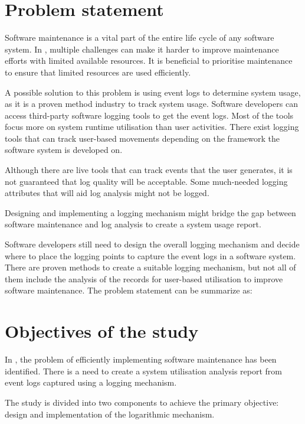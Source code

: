 \section{Problem statement}\label{sec:ch1_problemStatement}
Software maintenance is a vital part of the entire life cycle of any software system. In , multiple challenges can make it harder to improve maintenance efforts with limited available resources. It is beneficial to prioritise maintenance to ensure that limited resources are used efficiently. \par A possible solution to this problem is using event logs to determine system usage, as it is a proven method industry to track system usage. Software developers can access third-party software logging tools to get the event logs. Most of the tools focus more on system runtime utilisation than user activities. There exist logging tools that can track user-based movements depending on the framework the software system is developed on.\par Although there are live tools that can track events that the user generates, it is not guaranteed that log quality will be acceptable. Some much-needed logging attributes that will aid log analysis might not be logged.\par Designing and implementing a logging mechanism might bridge the gap between software maintenance and log analysis to create a system usage report.\par Software developers still need to design the overall logging mechanism and decide where to place the logging points to capture the event logs in a software system. There are proven methods to create a suitable logging mechanism, but not all of them include the analysis of the records for user-based utilisation to improve software maintenance. The problem statement can be summarize as:

\begin{center}
	\begin{tcolorbox}[colback=lightgray, colframe=black, sharp corners=all, arc=4pt]
		\begin{minipage}{\textwidth}
			\RaggedRight\textit{\problemStatement}
		\end{minipage}
	\end{tcolorbox}
\end{center}

\section{Objectives of the study}\label{sec:ch1_objectives}
In , the problem of efficiently implementing software maintenance has been identified. There is a need to create a system utilisation analysis report from event logs captured using a logging mechanism. \par The study is divided into two components to achieve the primary objective: design and implementation of the logarithmic mechanism. 

